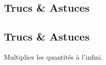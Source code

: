     \vspace{1cm}
    \hline
    \vspace{1cm}
    
    \subsection{Trucs \& Astuces}
        \subsection{Trucs \& Astuces}
	Multipliez les quantités à l'infini.
